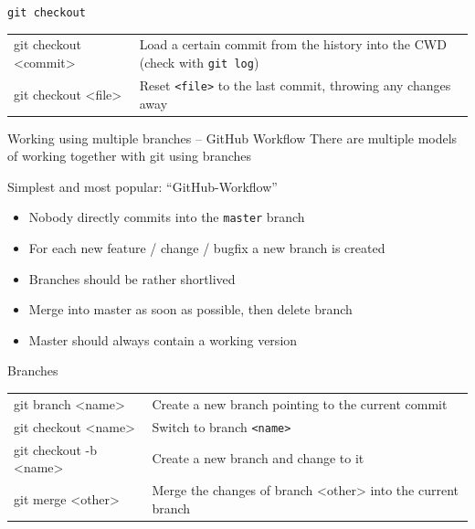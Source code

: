 \begin{frame}{\texttt{git checkout}}
  \begin{tabu}{>{\ttfamily}l X[,L]}
    git checkout <commit> & Load a certain commit from the history into the CWD (check with \texttt{git log}) \\
    git checkout <file>   & Reset \texttt{<file>} to the last commit, throwing any changes away
  \end{tabu}
\end{frame}

\begin{frame}[t]{Working using multiple branches – GitHub Workflow}
  There are multiple models of working together with git using branches

  Simplest and most popular: \enquote{GitHub-Workflow}

  \begin{itemize}
    \item Nobody directly commits into the \texttt{master} branch
    \item For each new feature / change / bugfix a new branch is created
    \item Branches should be rather shortlived
    \item Merge into master as soon as possible, then delete branch
    \item Master should always contain a working version
  \end{itemize}
\end{frame}

\begin{frame}{Branches}
  \begin{tabu}{>{\ttfamily}l X[,L]}
    git branch <name> & Create a new branch pointing to the current commit\\
    git checkout <name>   & Switch to branch \texttt{<name>} \\
    git checkout -b <name> & Create a new branch and change to it \\
    git merge <other> & Merge the changes of branch <other> into the current branch
  \end{tabu}
\end{frame}

